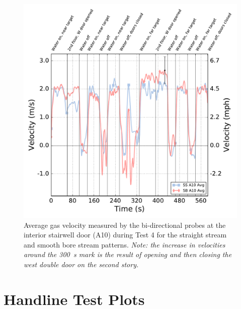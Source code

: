 \documentclass[12pt,oneside]{book}
\begin{document}
\begin{figure}[!ht]
	\includegraphics[width=\columnwidth]{../Figures/Plots/Test_70_West_101215_BDP_A10_stream_avgs}
	\caption[Average gas velocity through the interior stairwell door during Test 4 for the straight stream and smooth bore stream patterns.]{Average gas velocity measured by the bi-directional probes at the interior stairwell door (A10) during Test 4 for the straight stream and smooth bore stream patterns. \textit{Note: the increase in velocities around the 300~s mark is the result of opening and then closing the west double door on the second story.}}
	\label{fig:Test_4_BDP_A10_Avg_All}
	\end{figure}
\FloatBarrier

\chapter{Handline Test Plots}
\label{chap:handline_plots}
\end{document}
